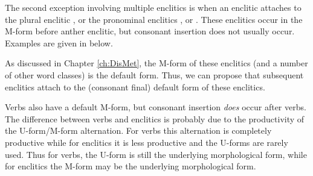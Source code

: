 \begin{exe}
	\label{ex:estiga=jen}
\end{exe}

The second exception involving multiple
enclitics is when an enclitic attaches to the plural enclitic ,
or the pronominal enclitics  {\kiit}, or  {\siin}.
These enclitics occur in the M-form
before anther enclitic, but consonant insertion
does not usually occur.
Examples are given in  below.

\begin{exe}
\end{exe}

As discussed in Chapter \ref{ch:DisMet}, the M-form
of these enclitics (and a number of other word classes) is the default form.
Thus, we can propose that subsequent enclitics attach to the
(consonant final) default form of these enclitics.

Verbs also have a default M-form,
but consonant insertion \emph{does} occur after verbs.
The difference between verbs and enclitics is probably
due to the productivity of the U-form/M-form alternation.
For verbs this alternation is completely productive
while for enclitics it is less productive
and the U-forms are rarely used.
Thus for verbs, the U-form is still the underlying
morphological form, while for enclitics the M-form
may be the underlying morphological form.


